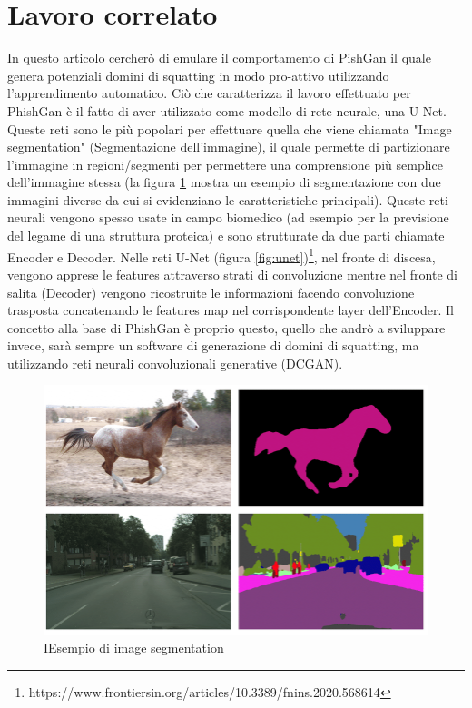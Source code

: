 \section{Lavoro correlato}
In questo articolo cercherò di emulare il comportamento di PishGan\cite{sern2020phishgan} il quale genera potenziali domini di squatting in modo pro-attivo utilizzando l'apprendimento automatico. Ciò che caratterizza il lavoro effettuato per PhishGan è il fatto di aver utilizzato come modello di rete neurale, una U-Net. Queste reti sono le più popolari per effettuare quella che viene chiamata "Image segmentation" (Segmentazione dell'immagine), il quale permette di partizionare l'immagine in regioni/segmenti per permettere una comprensione più semplice dell'immagine stessa (la figura \ref{fig:segmentation} mostra un esempio di segmentazione con due immagini diverse da cui si evidenziano le caratteristiche principali). Queste reti neurali vengono spesso usate in campo biomedico (ad esempio per la previsione del legame di una struttura proteica) e sono strutturate da due parti chiamate Encoder e Decoder. Nelle reti U-Net (figura \ref{fig:unet})\footnote[1]{https://www.frontiersin.org/articles/10.3389/fnins.2020.568614}, nel fronte di discesa, vengono apprese le features attraverso strati di convoluzione mentre nel fronte di salita (Decoder) vengono ricostruite le informazioni facendo convoluzione trasposta concatenando le features map nel corrispondente layer dell'Encoder.
Il concetto alla base di PhishGan è proprio questo, quello che andrò a sviluppare invece, sarà sempre un software di generazione di domini di squatting, ma utilizzando reti neurali convoluzionali generative (DCGAN).
\begin{figure}[!h]
  \centering
  \begin{minipage}[b]{\textwidth}
    \includegraphics[width=\textwidth]{pictures/segmentation.png}
    \caption{IEsempio di image segmentation}
    \label{fig:segmentation}
  \end{minipage}
  \hfill
\end{figure}
